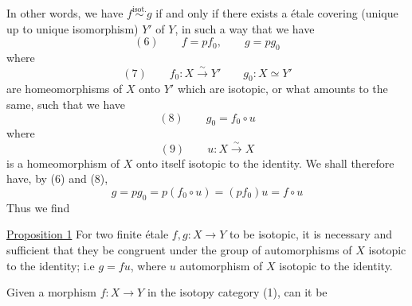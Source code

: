 In other words, we have $f\overset{\mathrm{isot.}}{\sim}g$ if and only if there exists a  étale covering (unique up to unique isomorphism) $Y'$ of $Y$, in such a way that we have
\[
(6)\qquad f=pf_0,\qquad g=pg_0
\]
where
\[
(7)\qquad f_0:X\xrightarrow{\sim}Y'\qquad g_0:X\simeq Y'
\]
are homeomorphisms of $X$ onto $Y'$ which are isotopic, or what amounts to the same, such that we have
\[
(8)\qquad g_0=f_0\circ u
\]
where
\[
(9)\qquad u:X\xrightarrow{\sim}X
\]
 is a homeomorphism of $X$ onto itself isotopic to the identity. We shall therefore have, by (6) and (8),
\[
g=pg_0=p(f_0\circ u)=(pf_0)u=f\circ u
\]
Thus we find

\uline{Proposition 1} For two finite étale   $f,g:X\longrightarrow Y$ to be isotopic, it is necessary and sufficient that they be congruent under the group of automorphisms of $X$ isotopic to the identity; i.e $g=fu$, where $u$ automorphism of $X$ isotopic to the identity.

Given a  morphism $f:X\longrightarrow Y$ in the isotopy category (1), can it be
